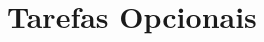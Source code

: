 \documentclass[12pt, a4paper]{article}
\begin{document}
\section{Tarefas Opcionais}
%
%
%
%
%
%
\end{document}
